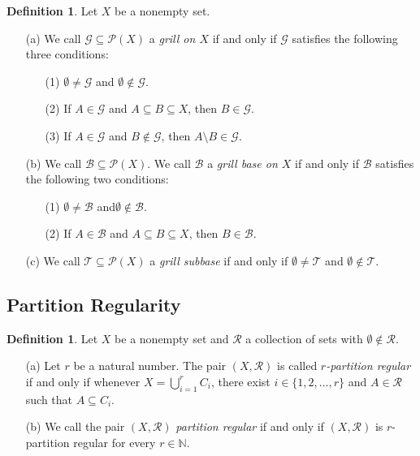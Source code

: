 \documentclass[12pt]{article}
\theoremstyle{plain}
\theoremstyle{definition}
\newtheorem{defn}[thm]{Definition}
\newcommand{\bbN}{\mathbb{N}}
\newcommand{\calB}{\mathcal{B}}
\newcommand{\calG}{\mathcal{G}}
\newcommand{\calP}{\mathcal{P}}
\newcommand{\calR}{\mathcal{R}}
\newcommand{\calT}{\mathcal{T}}
\begin{document}
\begin{defn}
  Let $X$ be a nonempty set.
  \begin{itemize}
    \item[(a)] We call $\calG \subseteq \calP(X)$ a \textsl{grill on
        $X$} if
      and only if $\calG$ satisfies the following three conditions:
      \begin{itemize}
        \item[(1)] $\emptyset \ne \calG$ and $\emptyset \not\in \calG$.

        \item[(2)] If $A \in \calG$ and $A \subseteq B \subseteq X$, then
          $B \in \calG$.

        \item[(3)] If $A \in \calG$ and $B \not\in \calG$, then $A
          \setminus B \in \calG$. 
     \end{itemize}

    \item[(b)] We call $\calB \subseteq \calP(X)$.
      We call $\calB$ a \textsl{grill base on $X$} if and only if $\calB$
      satisfies the following two conditions:
      \begin{itemize}
        \item[(1)] $\emptyset \ne \calB$ and$\emptyset \not\in \calB$.

        \item[(2)] If $A \in \calB$ and $A \subseteq B \subseteq X$, then
          $B \in \calB$.
      \end{itemize}

    \item[(c)] We call $\calT \subseteq \calP(X)$ a \textsl{grill
        subbase} if and only if $\emptyset \ne \calT$ and $\emptyset
      \not\in \calT$. 
  \end{itemize}
\end{defn}






\subsection{Partition Regularity}

\begin{defn}
  Let $X$ be a nonempty set and $\calR$ a collection of sets with
  $\emptyset\not\in \calR$. 
  \begin{itemize}
    \item[(a)] Let $r$ be a natural number. 
      The pair $(X, \calR)$ is called \textsl{\mbox{$r$-partition}
        regular} if and only if whenever $X = \bigcup_{i=1}^r
      C_i$, there exist $i \in \{1, 2, \ldots, r\}$ and $A \in \calR$
      such that $A \subseteq C_i$.

    \item[(b)] We call the pair $(X, \calR)$ \textsl{partition
        regular} if and only if $(X, \calR)$ is \mbox{$r$-partition}
      regular for every $r \in \bbN$.
  \end{itemize}
\end{defn}
\end{document}
